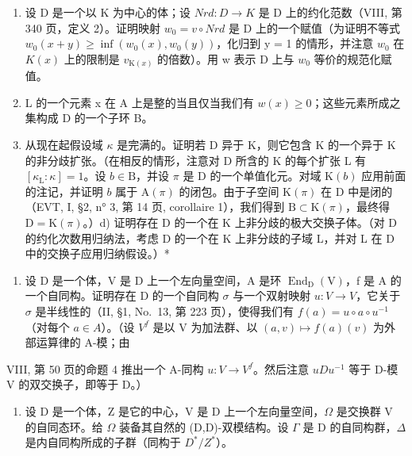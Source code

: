 \begin{enumerate}
\def\labelenumi{\alph{enumi})}
\item
  设 D 是一个以 K 为中心的体；设 \(Nrd : D \to K\) 是 D 上的约化范数（VIII, 第 340 页，定义 2）。证明映射 \(w_{0} = v \circ Nrd\) 是 D 上的一个赋值（为证明不等式 \(w_{0}(x + y) \geqslant \inf(w_{0}(x), w_{0}(y))\)，化归到 y = 1 的情形，并注意 \(w_{0}\) 在 \(K(x)\) 上的限制是 \(v_{\mathrm{K}(x)}\) 的倍数）。用 w 表示 D 上与 \(w_{0}\) 等价的规范化赋值。
\item
  L 的一个元素 x 在 A 上是整的当且仅当我们有 \(w(x) \geqslant 0\)；这些元素所成之集构成 D 的一个子环 B。
\item
  从现在起假设域 \(\kappa\) 是完满的。证明若 D 异于 K，则它包含 K 的一个异于 K 的非分歧扩张。（在相反的情形，注意对 D 所含的 K 的每个扩张 L 有 \([\kappa_{\mathrm{L}}:\kappa] = 1\)。设 \(b\in \mathrm{B}\)，并设 \(\pi\) 是 D 的一个单值化元。对域 \(\mathrm{K}(b)\) 应用前面的注记，并证明 \(b\) 属于 \(\mathrm{A}(\pi)\) 的闭包。由于子空间 \(\mathrm{K}(\pi)\) 在 D 中是闭的（EVT, I, §2, n° 3, 第 14 页, corollaire 1），我们得到 \(\mathrm{B}\subset \mathrm{K}(\pi)\)，最终得 \(\mathrm{D} = \mathrm{K}(\pi)\)。）d) 证明存在 D 的一个在 K 上非分歧的极大交换子体。（对 D 的约化次数用归纳法，考虑 D 的一个在 K 上非分歧的子域 L，并对 L 在 D 中的交换子应用归纳假设。）*
\end{enumerate}

\begin{enumerate}
\def\labelenumi{\arabic{enumi})}
\setcounter{enumi}{12}
\tightlist
\item
  设 D 是一个体，V 是 D 上一个左向量空间，A 是环 \(\operatorname{End}_{\mathrm{D}}(\mathrm{V})\)，f 是 A 的一个自同构。证明存在 D 的一个自同构 \(\sigma\) 与一个双射映射 \(u: V \to V\)，它关于 \(\sigma\) 是半线性的（II, §1, No.~13, 第 223 页），使得我们有 \(f(a) = u \circ a \circ u^{-1}\)（对每个 \(a \in A\)）。（设 \(V^{f}\) 是以 V 为加法群、以 \((a, v) \mapsto f(a)(v)\) 为外部运算律的 A-模；由
\end{enumerate}

VIII, 第 50 页的命题 4 推出一个 A-同构 \(u: V \to V^{f}\)。然后注意 \(uDu^{-1}\) 等于 D-模 V 的双交换子，即等于 D。）

\begin{enumerate}
\def\labelenumi{\arabic{enumi})}
\setcounter{enumi}{13}
\tightlist
\item
  设 D 是一个体，Z 是它的中心，V 是 D 上一个左向量空间，\(\Omega\) 是交换群 V 的自同态环。给 \(\Omega\) 装备其自然的 (D,D)-双模结构。设 \(\Gamma\) 是 D 的自同构群，\(\Delta\) 是内自同构所成的子群（同构于 \(D^{*}/Z^{*}\)）。
\end{enumerate}

